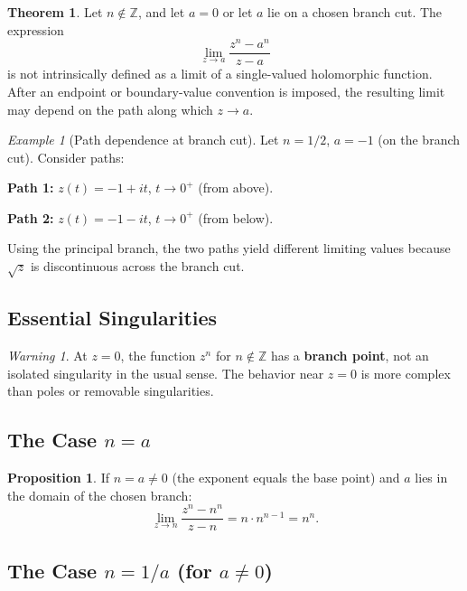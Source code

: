 \documentclass{article}
\theoremstyle{definition}
\newtheorem{theorem}{Theorem}[section]
\newtheorem{proposition}{Proposition}[section]
\theoremstyle{remark}
\newtheorem{example}{Example}[section]
\newtheorem{warning}{Warning}[section]
\newcommand{\Z}{\mathbb{Z}}
\begin{document}
\begin{theorem}
Let $n \notin \Z$, and let $a = 0$ or let $a$ lie on a chosen branch cut. The expression
\begin{equation}
\lim_{z \to a} \frac{z^n - a^n}{z - a}
\end{equation}
is not intrinsically defined as a limit of a single-valued holomorphic function.
After an endpoint or boundary-value convention is imposed, the resulting limit
may depend on the path along which $z \to a$.
\end{theorem}

\begin{example}[Path dependence at branch cut]
Let $n = 1/2$, $a = -1$ (on the branch cut). Consider paths:

\textbf{Path 1:} $z(t) = -1 + it$, $t \to 0^+$ (from above).

\textbf{Path 2:} $z(t) = -1 - it$, $t \to 0^+$ (from below).

Using the principal branch, the two paths yield different limiting values because $\sqrt{z}$ is discontinuous across the branch cut.
\end{example}

\subsection{Essential Singularities}

\begin{warning}
At $z = 0$, the function $z^n$ for $n \notin \Z$ has a \textbf{branch point}, not an isolated singularity in the usual sense. The behavior near $z = 0$ is more complex than poles or removable singularities.
\end{warning}

\subsection{The Case $n = a$}

\begin{proposition}
If $n = a \neq 0$ (the exponent equals the base point) and $a$ lies in the domain of the chosen branch:
\begin{equation}
\lim_{z \to n} \frac{z^n - n^n}{z - n} = n \cdot n^{n-1} = n^n.
\end{equation}
\end{proposition}

\subsection{The Case $n = 1/a$ (for $a \neq 0$)}
\end{document}
